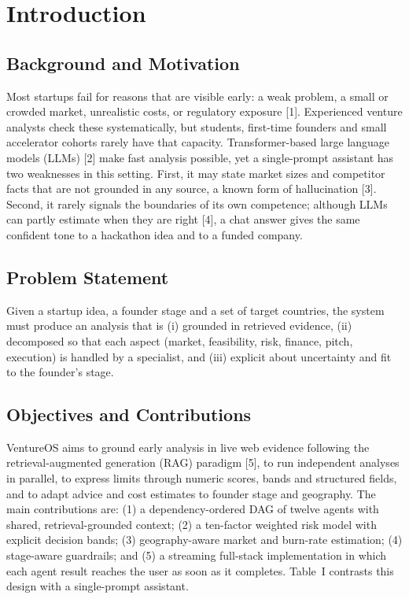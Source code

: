 \section{Introduction}
\subsection{Background and Motivation}
Most startups fail for reasons that are visible early: a weak problem, a small or crowded market, unrealistic costs, or regulatory exposure [1]. Experienced venture analysts check these systematically, but students, first-time founders and small accelerator cohorts rarely have that capacity. Transformer-based large language models (LLMs) [2] make fast analysis possible, yet a single-prompt assistant has two weaknesses in this setting. First, it may state market sizes and competitor facts that are not grounded in any source, a known form of hallucination [3]. Second, it rarely signals the boundaries of its own competence; although LLMs can partly estimate when they are right [4], a chat answer gives the same confident tone to a hackathon idea and to a funded company.

\subsection{Problem Statement}
Given a startup idea, a founder stage and a set of target countries, the system must produce an analysis that is (i) grounded in retrieved evidence, (ii) decomposed so that each aspect (market, feasibility, risk, finance, pitch, execution) is handled by a specialist, and (iii) explicit about uncertainty and fit to the founder's stage.

\subsection{Objectives and Contributions}
VentureOS aims to ground early analysis in live web evidence following the retrieval-augmented generation (RAG) paradigm [5], to run independent analyses in parallel, to express limits through numeric scores, bands and structured fields, and to adapt advice and cost estimates to founder stage and geography. The main contributions are: (1) a dependency-ordered DAG of twelve agents with shared, retrieval-grounded context; (2) a ten-factor weighted risk model with explicit decision bands; (3) geography-aware market and burn-rate estimation; (4) stage-aware guardrails; and (5) a streaming full-stack implementation in which each agent result reaches the user as soon as it completes. Table~I contrasts this design with a single-prompt assistant.

